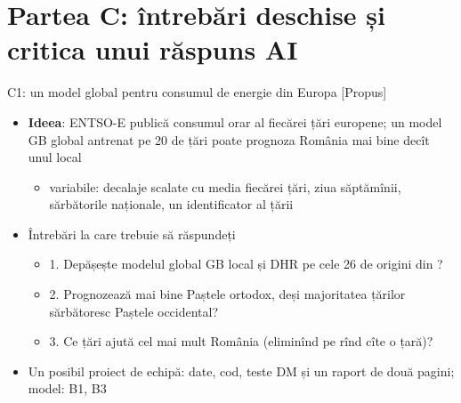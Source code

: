 \section{Partea C: întrebări deschise și critica unui răspuns AI}

\begin{frame}{C1: un model global pentru consumul de energie din Europa [Propus]}
\itemsize{\footnotesize}
\begin{itemize}
    \item \textbf{Ideea}: ENTSO-E publică consumul orar al fiecărei țări europene; un model GB global antrenat pe 20 de țări poate prognoza România mai bine decît unul local
    \begin{itemize}
        \item variabile: decalaje scalate cu media fiecărei țări, ziua săptămînii, sărbătorile naționale, un identificator al țării
    \end{itemize}
    \item Întrebări la care trebuie să răspundeți
    \begin{itemize}
        \item 1. Depășește modelul global GB local și DHR pe cele 26 de origini din ?
        \item 2. Prognozează mai bine Paștele ortodox, deși majoritatea țărilor sărbătoresc Paștele occidental?
        \item 3. Ce țări ajută cel mai mult România (eliminînd pe rînd cîte o țară)?
    \end{itemize}
    \item Un posibil proiect de echipă: date, cod, teste DM și un raport de două pagini; model: B1, B3
\end{itemize}
\end{frame}


